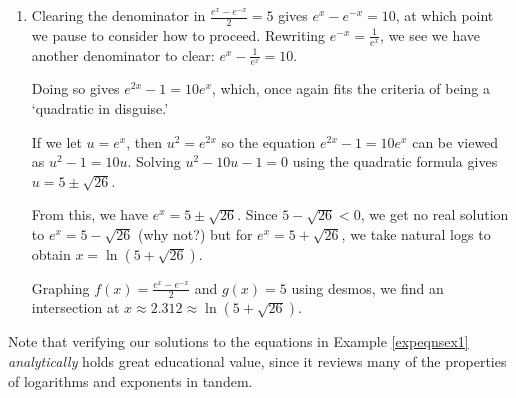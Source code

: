 \documentclass{ximera}
\begin{document}
\begin{example}
\begin{explanation}
\begin{enumerate}
Desmos shows the graphgs of $f(x) = 25^{x}$ and $g(x) = 5^{x} + 6$ intersect at $x \approx 0.683 \approx \frac{\ln(3)}{\ln(5)} $.

\begin{center}
\end{center}


\item  Clearing the denominator in  $\frac{e^{x} - e^{-x}}{2} = 5$ gives $e^{x} - e^{-x} = 10$, at which point we pause to consider how to proceed. Rewriting $e^{-x} = \frac{1}{e^{x}}$, we see we have another denominator to clear:  $e^{x} - \frac{1}{e^{x}} = 10$. 



Doing so gives $e^{2x} - 1 = 10e^{x}$, which, once again fits the criteria of being a `quadratic in disguise.' 



If we let $u = e^{x}$, then $u^2 = e^{2x}$ so the equation $e^{2x} - 1 = 10e^{x}$ can be viewed as $u^2-1 = 10u$.  Solving $u^2 - 10u - 1 = 0$ using the quadratic formula gives $u = 5 \pm \sqrt{26}$.  



From this, we have $e^{x} = 5 \pm \sqrt{26}$.  Since $5 - \sqrt{26} < 0$, we get no real solution to $e^{x} = 5 - \sqrt{26}$ (why not?) but for $e^{x} = 5 + \sqrt{26}$, we take natural logs to obtain $x = \ln\left(5 + \sqrt{26}\right)$.  



Graphing $f(x) = \frac{e^{x} - e^{-x}}{2}$ and $g(x) = 5$ using desmos, we find an intersection at $x \approx 2.312 \approx \ln\left(5 + \sqrt{26}\right)$.

\begin{center}
\end{center}


\end{enumerate}
\end{explanation}
\end{example}

Note that verifying our solutions to the equations in Example \ref{expeqnsex1} \textit{analytically} holds great educational value, since it reviews many of the properties of logarithms and exponents in tandem.
\end{document}
